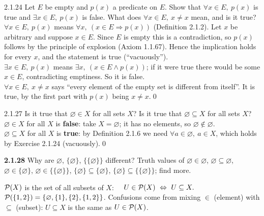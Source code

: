 \begin{bookex}[recommended]{2.1.24}
Let $E$ be empty and $p(x)$ a predicate on $E$. Show that $\forall x\in E,\ p(x)$ is true and $\exists x\in E,\ p(x)$ is false. What does $\forall x\in E,\ x\ne x$ mean, and is it true?
\solution
$\forall x\in E,\ p(x)$ means $\forall x,\ (x\in E\Rightarrow p(x))$ (Definition 2.1.2). Let $x$ be arbitrary and suppose $x\in E$. Since $E$ is empty this is a contradiction, so $p(x)$ follows by the principle of explosion (Axiom 1.1.67). Hence the implication holds for every $x$, and the statement is true (``vacuously'').\\
$\exists x\in E,\ p(x)$ means $\exists x,\ (x\in E\wedge p(x))$; if it were true there would be some $x\in E$, contradicting emptiness. So it is false.\\
$\forall x\in E,\ x\ne x$ says ``every element of the empty set is different from itself''. It is true, by the first part with $p(x)$ being $x\ne x$.\qed
\end{bookex}

\begin{bookex}[essential]{2.1.27}
Is it true that $\varnothing\in X$ for all sets $X$? Is it true that $\varnothing\subseteq X$ for all sets $X$?
\solution
$\varnothing\in X$ for all $X$ is \textbf{false}: take $X=\varnothing$; it has no elements, so $\varnothing\notin\varnothing$.\\
$\varnothing\subseteq X$ for all $X$ is \textbf{true}: by Definition 2.1.6 we need $\forall a\in\varnothing,\ a\in X$, which holds by Exercise 2.1.24 (vacuously).\qed
\end{bookex}

\begin{trybox}[{2.1.28 \fO}]
\textbf{2.1.28} Why are $\varnothing$, $\{\varnothing\}$, $\{\{\varnothing\}\}$ different? Truth values of $\varnothing\in\varnothing$, $\varnothing\subseteq\varnothing$, $\varnothing\in\{\varnothing\}$, $\varnothing\in\{\{\varnothing\}\}$, $\{\varnothing\}\subseteq\{\varnothing\}$, $\{\varnothing\}\subseteq\{\{\varnothing\}\}$; find more.
\end{trybox}

\begin{key}
$\mathcal{P}(X)$ is the set of all subsets of $X$: $\quad U\in\mathcal{P}(X)\ \Leftrightarrow\ U\subseteq X.$\quad $\mathcal{P}(\{1,2\})=\{\varnothing,\{1\},\{2\},\{1,2\}\}$. Confusions come from mixing $\in$ (element) with $\subseteq$ (subset): $U\subseteq X$ is the same as $U\in\mathcal{P}(X)$.
\end{key}

